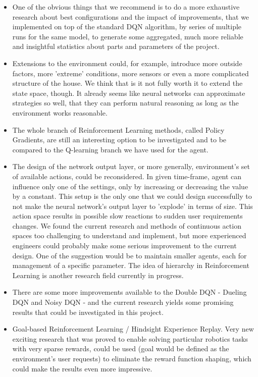 \documentclass{article}
\begin{document}
\begin{itemize}
\item One of the obvious things that we recommend is to do a more exhaustive research about best configurations and the impact of improvements, that we implemented on top of the standard DQN algorithm, by series of multiple runs for the same model, to generate some aggregated, much more reliable and insightful statistics about parts and parameters of the project.

\item Extensions to the environment could, for example, introduce more outside factors, more 'extreme' conditions, more sensors or even a more complicated structure of the house. We think that is it not fully worth it to extend the state space, though. It already seems like neural networks can approximate strategies so well, that they can perform natural reasoning as long as the environment works reasonable. 

\item The whole branch of Reinforcement Learning methods, called Policy Gradients, are still an interesting option to be investigated and to be compared to the Q-learning branch we have used for the agent. 

\item The design of the network output layer, or more generally, environment's set of available actions, could be reconsidered. In given time-frame, agent can influence only one of the settings, only by increasing or decreasing the value by a constant. This setup is the only one that we could design successfully to not make the neural network's output layer to 'explode' in terms of size. This action space results in possible slow reactions to sudden user requirements changes. We found the current research and methods of continuous action spaces too challenging to understand and implement, but more experienced engineers could probably make some serious improvement to the current design. One of the suggestion would be to maintain smaller agents, each for management of a specific parameter. The idea of hierarchy in Reinforcement Learning is another research field currently in progress.

\item There are some more improvements available to the Double DQN - Dueling DQN and Noisy DQN \cite{rainbow_paper} - and the current research yields some promising results that could be investigated in this project.

\item Goal-based Reinforcement Learning / Hindsight Experience Replay. Very new exciting research that was proved to enable solving particular robotics tasks with very sparse rewards, could be used (goal would be defined as the environment's user requests) to eliminate the reward function shaping, which could make the results even more impressive.


\end{itemize}
\end{document}
